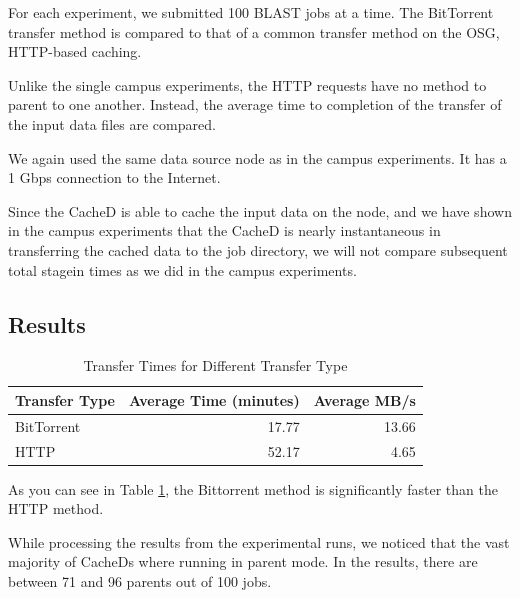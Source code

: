 For each experiment, we submitted 100 BLAST jobs at a time.  The BitTorrent transfer method is compared to that of a common transfer method on the OSG, HTTP-based caching. 




Unlike the single campus experiments, the HTTP requests have no method to parent to one another. Instead, the average time to completion of the transfer of the input data files are compared.

We again used the same data source node as in the campus experiments.  It has a 1 Gbps connection to the Internet.

Since the CacheD is able to cache the input data on the node, and we have shown in the campus experiments that the CacheD is nearly instantaneous in transferring the cached data to the job directory, we will not compare subsequent total stagein times as we did in the campus experiments.

\subsection{Results}



\begin{table}[h!t]
	\centering
	\bgroup
	\def\arraystretch{1.5}
\begin{tabular}{|l|r|r|}
\hline
\textbf{Transfer Type} & \textbf{Average Time (minutes)} & \textbf{Average MB/s} \\ \hline
BitTorrent & 17.77 & 13.66 \\ \hline
HTTP & 52.17 & 4.65 \\ \hline
\end{tabular}
\egroup
\caption{Transfer Times for Different Transfer Type}
\label{tbl:osgtransferstats}
\end{table}

As you can see in Table \ref{tbl:osgtransferstats}, the Bittorrent method is significantly faster than the HTTP method.  

While processing the results from the experimental runs, we noticed that the vast majority of CacheDs where running in parent mode.  In the results, there are between 71 and 96 parents out of 100 jobs.

